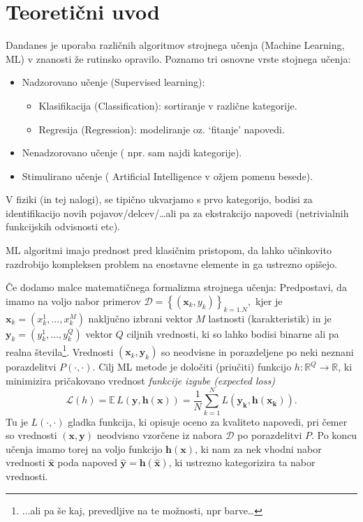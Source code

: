 \documentclass{article}
\begin{document}
\section{Teoretični uvod}
Dandanes je uporaba različnih algoritmov strojnega učenja (Machine Learning, ML) v 
znanosti že rutinsko opravilo. Poznamo tri osnovne vrste stojnega učenja:
\begin{itemize}
  \item Nadzorovano učenje (Supervised learning):
  \begin{itemize}
    \item Klasifikacija (Classification): sortiranje v različne kategorije.
    \item Regresija (Regression): modeliranje oz. `fitanje' napovedi.
  \end{itemize}
  \item Nenadzorovano učenje ( npr. sam najdi kategorije).
  \item Stimulirano učenje ( Artificial Intelligence v ožjem pomenu besede).
\end{itemize}
V fiziki (in tej nalogi), se tipično ukvarjamo s prvo kategorijo, bodisi za identifikacijo novih pojavov/delcev/\ldots ali pa za ekstrakcijo napovedi (netrivialnih funkcijskih odvisnosti etc).

ML algoritmi imajo prednost pred klasičnim pristopom, da lahko učinkovito razdrobijo kompleksen problem na enostavne elemente in ga ustrezno opišejo.

Če dodamo malce matematičnega formalizma strojnega učenja: Predpostavi, da imamo na voljo nabor primerov 
\(\mathcal{D}=\left\{\left(\mathbf{x}_{k}, y_{k}\right)\right\}_{k=1 . N},\) kjer je
\(\mathbf{x}_{k}=\left(x_{k}^{1}, \ldots, x_{k}^{M}\right)\) naključno izbrani vektor
 \(M\) lastnosti (karakteristik) in je \(\mathbf{y}_{k} = \left(y_{k}^{1}, \ldots, y_{k}^{Q}\right)\)
 vektor $Q$ ciljnih vrednosti, ki so lahko bodisi binarne ali pa realna 
 števila\footnote{...ali pa še kaj, prevedljive na te možnosti, npr barve\ldots}. 
 Vrednosti \(\left(\mathbf{x}_{k}, \mathbf{y}_{k}\right)\) so neodvisne in porazdeljene po neki
 neznani porazdelitvi \(P(\cdot, \cdot) .\) Cilj ML metode je določiti (priučiti) funkcijo
 \(h: \mathbb{R}^{Q} \rightarrow \mathbb{R}\), ki minimizira pričakovano vrednost \emph{funkcije
 izgube (expected loss)} \[
\mathcal{L}(h)=\mathbb{E}\, L(\mathbf{y}, \mathbf{h}(\mathbf{x})) = \frac{1}{N}\sum\limits_{k=1}^{N} L(\mathbf{y_k}, \mathbf{h}(\mathbf{x_k}))  .\] 
 Tu je \(L(\cdot, \cdot)\)  gladka funkcija, ki opisuje oceno za kvaliteto napovedi, 
 pri čemer so  vrednosti \((\mathbf{x}, \mathbf{y})\)
 neodvisno  vzorčene iz nabora \(\mathcal{D}\) po porazdelitvi \(P\). Po koncu učenja
 imamo torej na voljo funkcijo $\mathbf{h}(\mathbf{x})$, ki nam za nek vhodni nabor vrednosti
 $\mathbf{\hat{x}}$ poda napoved $\mathbf{\hat{y}}=\mathbf{h}(\mathbf{\hat{x}})$, ki ustrezno kategorizira
 ta nabor vrednosti. 
 
\end{document}
